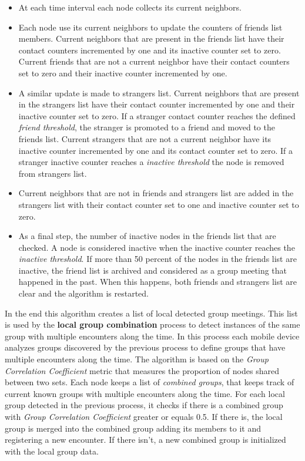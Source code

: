\begin{itemize}
	\item At each time interval each node collects its current neighbors.
	\item Each node use its current neighbors to update the counters of friends list members. Current neighbors that are present in the friends list have their contact counters incremented by one and its inactive counter set to zero. Current friends that are not a current neighbor have their contact counters set to zero and their inactive counter incremented by one.
	\item A similar update is made to strangers list. Current neighbors that are present in the strangers list have their contact counter incremented by one and their inactive counter set to zero. If a stranger contact counter reaches the defined \textit{friend threshold}, the stranger is promoted to a friend and moved to the friends list. Current strangers that are not a current neighbor have its inactive counter incremented by one and its contact counter set to zero. If a stranger inactive counter reaches a \textit{inactive threshold} the node is removed from strangers list.
	\item Current neighbors that are not in friends and strangers list are added in the strangers list with their contact counter set to one and inactive counter set to zero.
	\item As a final step, the number of inactive nodes in the friends list that are checked. A node is considered inactive when the inactive counter reaches the \textit{inactive threshold}. If more than 50 percent of the nodes in the friends list are inactive, the friend list is archived and considered as a group meeting that happened in the past. When this happens, both friends and strangers list are clear and the algorithm is restarted.
\end{itemize}

In the end this algorithm creates a list of local detected group meetings. This list is used by the \textbf{local group combination} process to detect instances of the same group with multiple encounters along the time. In this process each mobile device analyzes groups discovered by the previous process to define groups that have multiple encounters along the time. The algorithm is based on the \textit{Group Correlation Coefficient} metric that measures the proportion of nodes shared between two sets. Each node keeps a list of \textit{combined groups}, that keeps track of current known groups with multiple encounters along the time. For each local group detected in the previous process, it checks if there is a combined group with \textit{Group Correlation Coefficient} greater or equals 0.5. If there is, the local group is merged into the combined group adding its members to it and registering a new encounter. If there isn't, a new combined group is initialized with the local group data.

